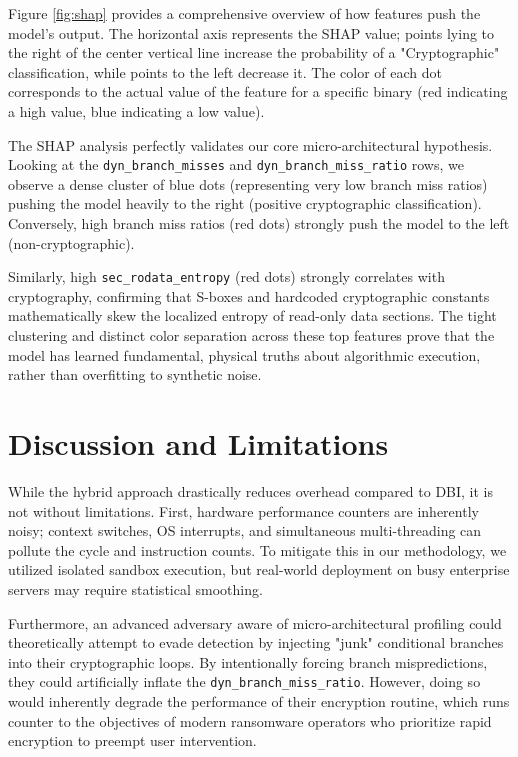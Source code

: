 \documentclass[conference]{IEEEtran}
\begin{document}
Figure \ref{fig:shap} provides a comprehensive overview of how features push the model's output. The horizontal axis represents the SHAP value; points lying to the right of the center vertical line increase the probability of a "Cryptographic" classification, while points to the left decrease it. The color of each dot corresponds to the actual value of the feature for a specific binary (red indicating a high value, blue indicating a low value).

The SHAP analysis perfectly validates our core micro-architectural hypothesis. Looking at the \texttt{dyn\_branch\_misses} and \texttt{dyn\_branch\_miss\_ratio} rows, we observe a dense cluster of blue dots (representing very low branch miss ratios) pushing the model heavily to the right (positive cryptographic classification). Conversely, high branch miss ratios (red dots) strongly push the model to the left (non-cryptographic). 

Similarly, high \texttt{sec\_rodata\_entropy} (red dots) strongly correlates with cryptography, confirming that S-boxes and hardcoded cryptographic constants mathematically skew the localized entropy of read-only data sections. The tight clustering and distinct color separation across these top features prove that the model has learned fundamental, physical truths about algorithmic execution, rather than overfitting to synthetic noise.

\section{Discussion and Limitations}
While the hybrid approach drastically reduces overhead compared to DBI, it is not without limitations. First, hardware performance counters are inherently noisy; context switches, OS interrupts, and simultaneous multi-threading can pollute the cycle and instruction counts. To mitigate this in our methodology, we utilized isolated sandbox execution, but real-world deployment on busy enterprise servers may require statistical smoothing.

Furthermore, an advanced adversary aware of micro-architectural profiling could theoretically attempt to evade detection by injecting "junk" conditional branches into their cryptographic loops. By intentionally forcing branch mispredictions, they could artificially inflate the \texttt{dyn\_branch\_miss\_ratio}. However, doing so would inherently degrade the performance of their encryption routine, which runs counter to the objectives of modern ransomware operators who prioritize rapid encryption to preempt user intervention.
\end{document}
